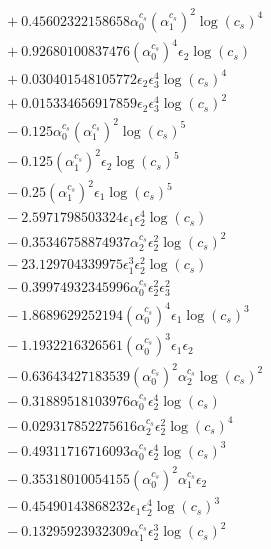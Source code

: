 \documentclass[10pt]{article}
\begin{document}
\begin{align*}
&{}  + 0.45602322158658 \alpha_{0}^{c_s} \left(\alpha_{1}^{c_s}\right)^{2} \log{\left(c_{s} \right)}^{4} \\
&{}  + 0.92680100837476 \left(\alpha_{0}^{c_s}\right)^{4} \epsilon_{2} \log{\left(c_{s} \right)} \\
&{}  + 0.030401548105772 \epsilon_{2} \epsilon_{3}^{4} \log{\left(c_{s} \right)}^{4} \\
&{}  + 0.015334656917859 \epsilon_{2} \epsilon_{3}^{4} \log{\left(c_{s} \right)}^{2} \\
&{}  - 0.125 \alpha_{0}^{c_s} \left(\alpha_{1}^{c_s}\right)^{2} \log{\left(c_{s} \right)}^{5} \\
&{}  - 0.125 \left(\alpha_{1}^{c_s}\right)^{2} \epsilon_{2} \log{\left(c_{s} \right)}^{5} \\
&{}  - 0.25 \left(\alpha_{1}^{c_s}\right)^{2} \epsilon_{1} \log{\left(c_{s} \right)}^{5} \\
&{}  - 2.5971798503324 \epsilon_{1} \epsilon_{2}^{4} \log{\left(c_{s} \right)} \\
&{}  - 0.35346758874937 \alpha_{2}^{c_s} \epsilon_{2}^{2} \log{\left(c_{s} \right)}^{2} \\
&{}  - 23.129704339975 \epsilon_{1}^{3} \epsilon_{2}^{2} \log{\left(c_{s} \right)} \\
&{}  - 0.39974932345996 \alpha_{0}^{c_s} \epsilon_{2}^{2} \epsilon_{3}^{2} \\
&{}  - 1.8689629252194 \left(\alpha_{0}^{c_s}\right)^{4} \epsilon_{1} \log{\left(c_{s} \right)}^{3} \\
&{}  - 1.1932216326561 \left(\alpha_{0}^{c_s}\right)^{3} \epsilon_{1} \epsilon_{2} \\
&{}  - 0.63643427183539 \left(\alpha_{0}^{c_s}\right)^{2} \alpha_{2}^{c_s} \log{\left(c_{s} \right)}^{2} \\
&{}  - 0.31889518103976 \alpha_{0}^{c_s} \epsilon_{2}^{4} \log{\left(c_{s} \right)} \\
&{}  - 0.029317852275616 \alpha_{2}^{c_s} \epsilon_{2}^{2} \log{\left(c_{s} \right)}^{4} \\
&{}  - 0.49311716716093 \alpha_{0}^{c_s} \epsilon_{2}^{4} \log{\left(c_{s} \right)}^{3} \\
&{}  - 0.35318010054155 \left(\alpha_{0}^{c_s}\right)^{2} \alpha_{1}^{c_s} \epsilon_{2} \\
&{}  - 0.45490143868232 \epsilon_{1} \epsilon_{2}^{4} \log{\left(c_{s} \right)}^{3} \\
&{}  - 0.13295923932309 \alpha_{1}^{c_s} \epsilon_{2}^{3} \log{\left(c_{s} \right)}^{2} \\

\end{align*}
\end{document}
